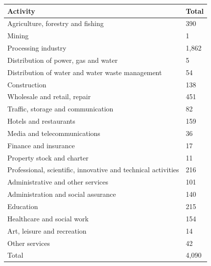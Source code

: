 \documentclass{article}
\begin{document}
\begin{tabular}{ll}
\toprule
Activity & Total \\
\midrule
Agriculture, forestry and fishing & 390 \\
Mining & 1 \\
Processing industry & 1,862 \\
Distribution of power, gas and water & 5 \\
Distribution of water and water waste management & 54 \\
Construction & 138 \\
Wholesale and retail, repair & 451 \\
Traffic, storage and communication & 82 \\
Hotels and restaurants & 159 \\
Media and telecommunications & 36 \\
Finance and insurance & 17 \\
Property stock and charter & 11 \\
Professional, scientific, innovative and technical activities & 216 \\
Administrative and other services & 101 \\
Administration and social assurance & 140 \\
Education & 215 \\
Healthcare and social work & 154 \\
Art, leisure and recreation & 14 \\
Other services & 42 \\
Total & 4,090 \\
\bottomrule
\end{tabular}
\end{document}

